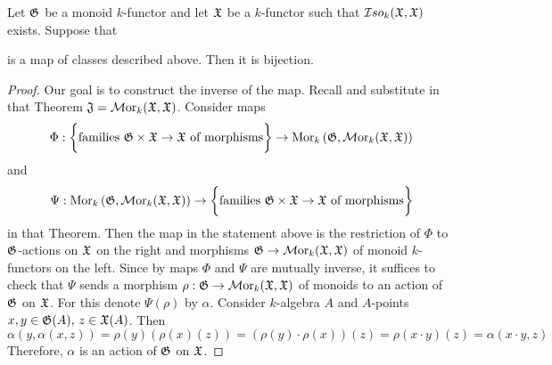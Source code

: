 \begin{theorem}\label{theorem:actions_and_monoid_morphisms}
Let ${\mathfrak G}$ be a monoid $k$-functor and let ${\mathfrak X}$ be a $k$-functor such that ${\mathcal I} so_{k}({\mathfrak X},{\mathfrak X})$ exists. Suppose that
\begin{center}
\end{center}
is a map of classes described above. Then it is bijection.
\end{theorem}
\begin{proof}
Our goal is to construct the inverse of the map. Recall {\cite[Theorem 2.7]{kfunctors}} and substitute in that Theorem ${\mathfrak J} = \mathcal{M}\mathrm{or}_k({\mathfrak X},{\mathfrak X})$. Consider maps
$$\Phi:\bigg\{\mbox{families }{\mathfrak G}\times {\mathfrak X}\rightarrow {\mathfrak X}\mbox{ of morphisms}\bigg\} \rightarrow  \mathrm{Mor}_{k}\left({\mathfrak G},\mathcal{M}\mathrm{or}_k({\mathfrak X},{\mathfrak X})\right)$$
and
$$\Psi:\mathrm{Mor}_{k}\left({\mathfrak G}, \mathcal{M}\mathrm{or}_k({\mathfrak X},{\mathfrak X})\right) \rightarrow \bigg\{\mbox{families }{\mathfrak G}\times {\mathfrak X}\rightarrow {\mathfrak X}\mbox{ of morphisms}\bigg\}$$
in that Theorem. Then the map in the statement above is the restriction of $\Phi$ to ${\mathfrak G}$-actions on ${\mathfrak X}$ on the right and morphisms ${\mathfrak G}\rightarrow \mathcal{M}\mathrm{or}_k({\mathfrak X},{\mathfrak X})$ of monoid $k$-functors on the left. Since by {\cite[Theorem 2.7]{kfunctors}} maps $\Phi$ and $\Psi$ are mutually inverse, it suffices to check that $\Psi$ sends a morphism $\rho:{\mathfrak G}\rightarrow \mathcal{M}\mathrm{or}_{k}({\mathfrak X},{\mathfrak X})$ of monoids to an action of ${\mathfrak G}$ on ${\mathfrak X}$. For this denote $\Psi(\rho)$ by $\alpha$. Consider $k$-algebra $A$ and $A$-points $x,y\in {\mathfrak G}(A),\,z\in {\mathfrak X}(A)$. Then
$$\alpha\left(y, \alpha(x, z)\right) = \rho(y)\left(\rho(x)(z)\right) = \left(\rho(y)\cdot \rho(x)\right)(z) = \rho\left(x\cdot y\right)(z) = \alpha\left(x\cdot y, z\right)$$
Therefore, $\alpha$ is an action of ${\mathfrak G}$ on ${\mathfrak X}$.
\end{proof}

